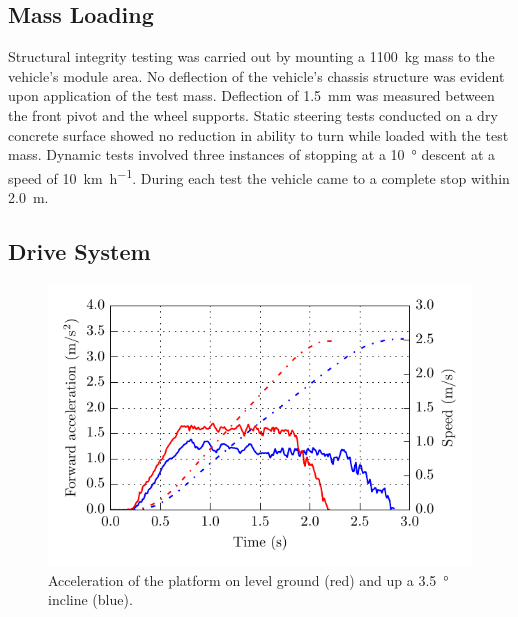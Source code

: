 \documentclass[preprint,authoryear,12pt]{elsarticle}
\begin{document}
  \subsection{Mass Loading}
    Structural integrity testing was carried out by mounting a \SI{1100}{\kilo\gram} mass to the vehicle's module area.
    No deflection of the vehicle's chassis structure was evident upon application of the test mass.
    Deflection of \SI{1.5}{\milli\meter} was measured between the front pivot and the wheel supports.
    Static steering tests conducted on a dry concrete surface showed no reduction in ability to turn while loaded with the test mass.
    Dynamic tests involved three instances of stopping at a \SI{10}{\degree} descent at a speed of \SI{10}{\kilo\meter\per\hour}.
    During each test the vehicle came to a complete stop within \SI{2.0}{\meter}.

  \subsection{Drive System}

    \begin{figure}[htb]
        \centering
        \includegraphics{imgs/drive_system/graph_acceleration.pdf}
        \caption{
            Acceleration of the platform on level ground (red) and up a \SI{3.5}{\degree} incline (blue).
        }
        \label{fig:acceleration}
    \end{figure}
\end{document}
